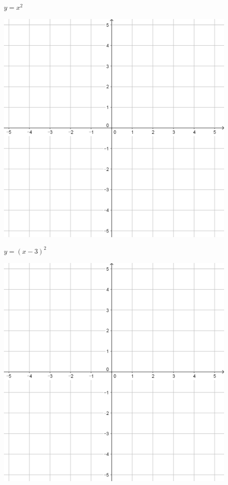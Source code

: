 \documentclass[a4paper]{oblivoir}
\begin{document}
\clearpage
\begin{minipage}{0.45\textwidth}\centering
\(y=x^2\)
\par\bigskip\includegraphics[width=0.9\textwidth]{55}
\end{minipage}
\begin{minipage}{0.45\textwidth}\centering
\(y=(x-3)^2\)
\par\bigskip\includegraphics[width=0.9\textwidth]{55}
\end{minipage}\bigskip\bigskip\par
\end{document}
